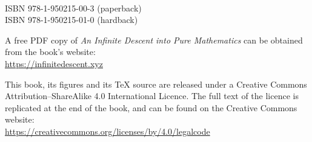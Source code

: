 {\small
~

\vfill

\thispagestyle{empty}


ISBN 978-1-950215-00-3 (paperback)\\
ISBN 978-1-950215-01-0 (hardback)

\begin{minipage}{0.75\textwidth}
\small
A free PDF copy of \textit{An Infinite Descent into Pure Mathematics} can be obtained from the book's website:\\
\url{https://infinitedescent.xyz}
\end{minipage}

\begin{minipage}{0.75\textwidth}
\small
This book, its figures and its \TeX{} source are released under a Creative Commons Attribution--ShareAlike 4.0 International Licence. The full text of the licence is replicated at the end of the book, and can be found on the Creative Commons website:\\
\url{https://creativecommons.org/licenses/by/4.0/legalcode}
\end{minipage}

}